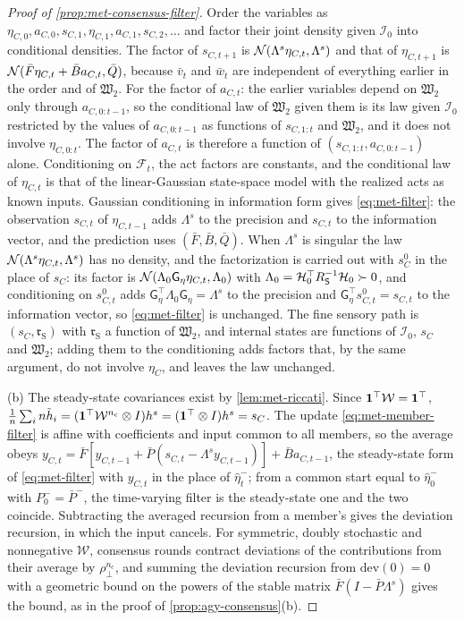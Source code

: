 \begin{proof}[Proof of \cref{prop:met-consensus-filter}]
Order the variables as $\eta_{C,0},a_{C,0},s_{C,1},\eta_{C,1},a_{C,1},s_{C,2},\dots$ and factor their joint density given $\mathcal I_0$ into conditional densities. The factor of $s_{C,t+1}$ is $\mathcal{N}(\Lambda^s\eta_{C,t},\Lambda^s)$ and that of $\eta_{C,t+1}$ is $\mathcal{N}(\bar F\eta_{C,t}+\bar Ba_{C,t},\bar Q)$, because $\bar v_t$ and $\bar w_t$ are independent of everything earlier in the order and of $\mathfrak W_2$. For the factor of $a_{C,t}$: the earlier variables depend on $\mathfrak W_2$ only through $a_{C,0:t-1}$, so the conditional law of $\mathfrak W_2$ given them is its law given $\mathcal I_0$ restricted by the values of $a_{C,0:t-1}$ as functions of $s_{C,1:t}$ and $\mathfrak W_2$, and it does not involve $\eta_{C,0:t}$. The factor of $a_{C,t}$ is therefore a function of $(s_{C,1:t},a_{C,0:t-1})$ alone. Conditioning on $\mathcal F_t$, the act factors are constants, and the conditional law of $\eta_{C,t}$ is that of the linear-Gaussian state-space model with the realized acts as known inputs. Gaussian conditioning in information form gives \eqref{eq:met-filter}: the observation $s_{C,t}$ of $\eta_{C,t-1}$ adds $\Lambda^s$ to the precision and $s_{C,t}$ to the information vector, and the prediction uses $(\bar F,\bar B,\bar Q)$. When $\Lambda^s$ is singular the law $\mathcal{N}(\Lambda^s\eta_{C,t},\Lambda^s)$ has no density, and the factorization is carried out with $s^0_C$ in the place of $s_C$: its factor is $\mathcal{N}(\Lambda_0\mathsf G_\eta\eta_{C,t},\Lambda_0)$ with $\Lambda_0=\mathcal H_0^\top R_{\mathsf{S}}^{-1}\mathcal H_0\succ0$, and conditioning on $s^0_{C,t}$ adds $\mathsf G_\eta^\top\Lambda_0\mathsf G_\eta=\Lambda^s$ to the precision and $\mathsf G_\eta^\top s^0_{C,t}=s_{C,t}$ to the information vector, so \eqref{eq:met-filter} is unchanged. The fine sensory path is $(s_C,\mathfrak r_{\mathrm S})$ with $\mathfrak r_{\mathrm S}$ a function of $\mathfrak W_2$, and internal states are functions of $\mathcal I_0$, $s_C$ and $\mathfrak W_2$; adding them to the conditioning adds factors that, by the same argument, do not involve $\eta_C$, and leaves the law unchanged.

(b) The steady-state covariances exist by \cref{lem:met-riccati}. Since $\mathbf{1}^\top\mathcal W=\mathbf{1}^\top$, $\frac1n\sum_in\tilde h_i=(\mathbf{1}^\top\mathcal W^{n_{\mathrm c}}\otimes I)h^s=(\mathbf{1}^\top\otimes I)h^s=s_C$. The update \eqref{eq:met-member-filter} is affine with coefficients and input common to all members, so the average obeys $y_{C,t}=\bar F[y_{C,t-1}+\bar P(s_{C,t}-\Lambda^sy_{C,t-1})]+\bar Ba_{C,t-1}$, the steady-state form of \eqref{eq:met-filter} with $y_{C,t}$ in the place of $\hat\eta^-_t$; from a common start equal to $\hat\eta^-_0$ with $P^-_0=\bar P^-$, the time-varying filter is the steady-state one and the two coincide. Subtracting the averaged recursion from a member's gives the deviation recursion, in which the input cancels. For symmetric, doubly stochastic and nonnegative $\mathcal W$, consensus rounds contract deviations of the contributions from their average by $\rho_\perp^{n_{\mathrm c}}$, and summing the deviation recursion from $\mathrm{dev}(0)=0$ with a geometric bound on the powers of the stable matrix $\bar F(I-\bar P\Lambda^s)$ gives the bound, as in the proof of \cref{prop:agy-consensus}(b).


\end{proof}

